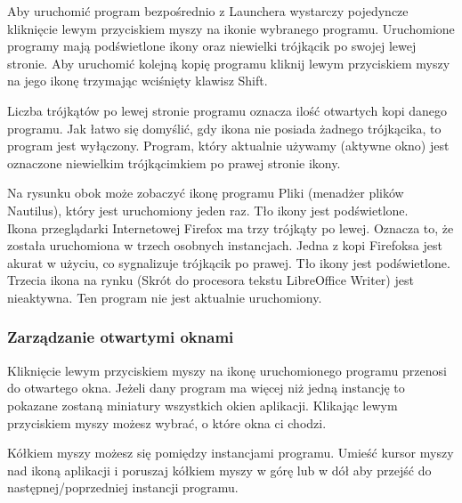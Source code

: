 \begin{figure}
\end{figure}

Aby uruchomić program bezpośrednio z Launchera wystarczy pojedyncze kliknięcie lewym przyciskiem myszy na ikonie wybranego programu. Uruchomione programy mają podświetlone ikony oraz niewielki trójkącik po swojej lewej stronie. Aby uruchomić kolejną kopię programu kliknij lewym przyciskiem myszy na jego ikonę trzymając wciśnięty klawisz Shift.

\noindent Liczba trójkątów po lewej stronie programu oznacza ilość otwartych kopi danego programu. Jak łatwo się domyślić, gdy ikona nie posiada żadnego trójkącika, to program jest wyłączony. Program, który aktualnie używamy (aktywne okno) jest oznaczone niewielkim trójkącimkiem po prawej stronie ikony.

\noindent Na rysunku obok może zobaczyć ikonę programu Pliki (menadżer plików Nautilus), który jest uruchomiony jeden raz. Tło ikony jest podświetlone.\\
Ikona przeglądarki Internetowej Firefox ma trzy trójkąty po lewej. Oznacza to, że została uruchomiona w trzech osobnych instancjach. Jedna z kopi Firefoksa jest akurat w użyciu, co sygnalizuje trójkącik po prawej. Tło ikony jest podświetlone.\\
Trzecia ikona na rynku (Skrót do procesora tekstu LibreOffice Writer) jest nieaktywna. Ten program nie jest aktualnie uruchomiony.

\subsubsection{Zarządzanie otwartymi oknami}
Kliknięcie lewym przyciskiem myszy na ikonę uruchomionego programu przenosi do otwartego okna. Jeżeli dany program ma więcej niż jedną instancję to pokazane zostaną miniatury wszystkich okien aplikacji. Klikając lewym przyciskiem myszy możesz wybrać, o które okna ci chodzi. 

Kółkiem myszy możesz się pomiędzy instancjami programu. Umieść kursor myszy nad ikoną aplikacji i poruszaj kółkiem myszy w górę lub w dół aby przejść do następnej/poprzedniej instancji programu.


